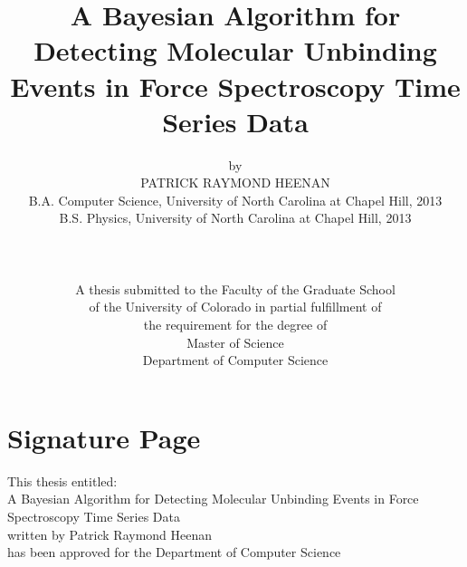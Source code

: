\documentclass[%
  aip,12pt,tightenlines,
  amsthm,
 amsmath,amssymb
]{article}
\newcommand{\TitleName}[0]{A Bayesian Algorithm for Detecting Molecular Unbinding Events in Force Spectroscopy Time Series Data}
\begin{document}
\singlespacing


\title{\TitleName{}}
\author{
by \\
PATRICK RAYMOND HEENAN \\
B.A. Computer Science, University of North Carolina at Chapel Hill, 2013 \\
B.S. Physics, University of North Carolina at Chapel Hill, 2013 \\
\\
\\
\\
A thesis submitted to the Faculty of the Graduate School\\ 
of the University of Colorado in partial fulfillment of\\
the requirement for the degree of\\
Master of Science \\
Department of Computer Science\\
}


\maketitle
\thispagestyle{empty}


\clearpage

\section{Signature Page}

\begin{center}
This thesis entitled: \\
\TitleName \\
written by Patrick Raymond Heenan \\
has been approved for the Department of Computer Science \\
\end{center}

\leavevmode \newline
\end{document}
